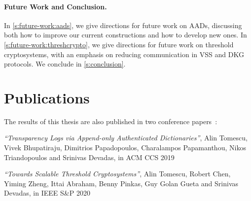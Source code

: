 \paragraph{Future Work and Conclusion.}
In \cref{s:future-work:aads}, we give directions for future work on AADs, discussing both how to improve our current constructions and how to develop new ones.
In \cref{s:future-work:threshcrypto}, we give directions for future work on threshold cryptosystems, with an emphasis on reducing communication in VSS and DKG protocols.
We conclude in \cref{s:conclusion}.

\section{Publications}
The results of this thesis are also published in two conference papers~\cite{TBP+19,TCZ+20}:

\begin{center}
\textit{``Transparency Logs via Append-only Authenticated Dictionaries''},
Alin Tomescu, Vivek Bhupatiraju, Dimitrios Papadopoulos, Charalampos Papamanthou, Nikos Triandopoulos and Srinivas Devadas, in ACM CCS 2019
\end{center}

\begin{center}
\textit{``Towards Scalable Threshold Cryptosystems''}, Alin Tomescu, Robert Chen, Yiming Zheng, Ittai Abraham, Benny Pinkas, Guy Golan Gueta and Srinivas Devadas, in IEEE S\&P 2020
\end{center}